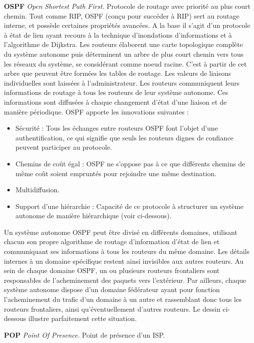 \textbf{OSPF} \textit{Open Shortest Path First.} Protocole de routage avec priorité au plus court chemin.
Tout comme RIP, OSPF (conçu pour succéder à RIP) sert au routage interne, et
possède certaines propriétés avancées. A la base il s’agit d’un protocole à état de lien ayant
recours à la technique d’inondations d’informations et à l’algorithme de Dijkstra. Les
routeurs élaborent une carte topologique complète du système autonome puis déterminent
un arbre de plus court chemin vers tous les réseaux du système, se considérant comme
noeud racine. C’est à partir de cet arbre que peuvent être formées les tables de routage.
Les valeurs de liaisons individuelles sont laissées à l’administrateur.
Les routeurs communiquent leurs informations de routage à tous les routeurs de leur
système autonome. Ces informations sont diffusées à chaque changement d’état d’une
liaison et de manière périodique.
OSPF apporte les innovations suivantes :
\begin{itemize}
	\item Sécurité : Tous les échanges entre routeurs OSPF font l’objet d’une authentification,
ce qui signifie que seuls les routeurs dignes de confiance peuvent participer au
protocole.
	\item Chemins de coût égal : OSPF ne s’oppose pas à ce que différents chemins de même
coût soient empruntés pour rejoindre une même destination.
	\item Multidiffusion.
	\item Support d’une hiérarchie : Capacité de ce protocole à structurer un système
autonome de manière hiérarchique (voir ci-dessous).
\end{itemize}
Un système autonome OSPF peut être divisé en différents domaines, utilisant chacun
son propre algorithme de routage d’information d’état de lien et communiquant ses
informations à tous les routeurs du même domaine. Les détails internes à un domaine
spécifique restent ainsi invisibles aux autres routeurs. Au sein de chaque domaine OSPF,
un ou plusieurs routeurs frontaliers sont responsables de l’acheminement des paquets
vers l’extérieur. Par ailleurs, chaque système autonome dispose d’un domaine fédérateur
ayant pour fonction l’acheminement du trafic d’un domaine à un autre et rassemblant
donc tous les routeurs frontaliers, ainsi qu’éventuellement d’autres routeurs. Le dessin
ci-dessous illustre parfaitement cette situation.


\textbf{POP} \textit{Point Of Presence.} Point de présence d’un ISP.



